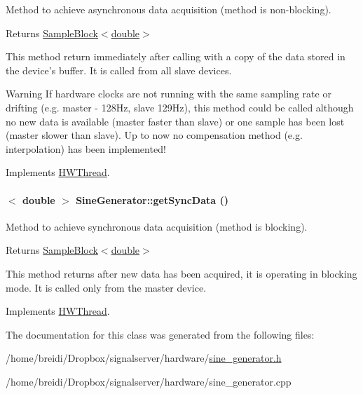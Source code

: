 Method to achieve asynchronous data acquisition (method is non-\/blocking). \begin{DoxyReturn}{Returns}
\hyperlink{class_sample_block}{SampleBlock$<$double$>$}
\end{DoxyReturn}
This method return immediately after calling with a copy of the data stored in the device's buffer. It is called from all slave devices. \begin{DoxyWarning}{Warning}
If hardware clocks are not running with the same sampling rate or drifting (e.g. master -\/ 128Hz, slave 129Hz), this method could be called although no new data is available (master faster than slave) or one sample has been lost (master slower than slave). Up to now no compensation method (e.g. interpolation) has been implemented! 
\end{DoxyWarning}


Implements \hyperlink{class_h_w_thread_aa709526a915411a495a947f6bc6e06f9}{HWThread}.\hypertarget{class_sine_generator_a7c239c664d3559988889cd5d9f90d854}{
\paragraph[{getSyncData}]{$<$ double $>$ SineGenerator::getSyncData ()}\hfill}
\label{class_sine_generator_a7c239c664d3559988889cd5d9f90d854}


Method to achieve synchronous data acquisition (method is blocking). \begin{DoxyReturn}{Returns}
\hyperlink{class_sample_block}{SampleBlock$<$double$>$}
\end{DoxyReturn}
This method returns after new data has been acquired, it is operating in blocking mode. It is called only from the master device. 

Implements \hyperlink{class_h_w_thread_add1215b3e0f06a856330f2debd7ea2fe}{HWThread}.

The documentation for this class was generated from the following files:\begin{DoxyCompactItemize}
\item 
/home/breidi/Dropbox/signalserver/hardware/\hyperlink{sine__generator_8h}{sine\_\-generator.h}\item 
/home/breidi/Dropbox/signalserver/hardware/sine\_\-generator.cpp\end{DoxyCompactItemize}
